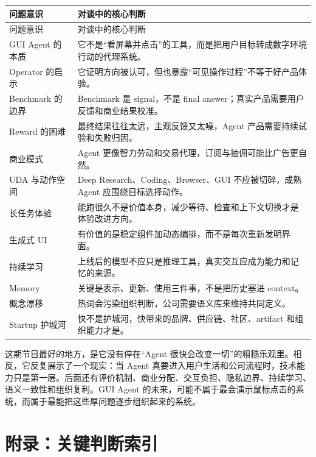 \documentclass[a4paper]{article}
\begin{document}
\begin{longtable}{>{\raggedright\arraybackslash}p{} >{\raggedright\arraybackslash}p{}}
\toprule
问题意识 & 对谈中的核心判断 \\
\midrule
\endfirsthead
\toprule
问题意识 & 对谈中的核心判断 \\
\midrule
\endhead
GUI Agent 的本质 & 它不是“看屏幕并点击”的工具，而是把用户目标转成数字环境行动的代理系统。 \\
Operator 的启示 & 它证明方向被认可，但也暴露“可见操作过程”不等于好产品体验。 \\
Benchmark 的边界 & Benchmark 是 signal，不是 final answer；真实产品需要用户反馈和商业结果校准。 \\
Reward 的困难 & 最终结果往往太远，主观反馈又太噪，Agent 产品需要持续试验和失败归因。 \\
商业模式 & Agent 更像智力劳动和交易代理，订阅与抽佣可能比广告更自然。 \\
UDA 与动作空间 & Deep Research、Coding、Browser、GUI 不应被切碎，成熟 Agent 应围绕目标选择动作。 \\
长任务体验 & 能跑很久不是价值本身，减少等待、检查和上下文切换才是体验改进方向。 \\
生成式 UI & 有价值的是稳定组件加动态编排，而不是每次重新发明界面。 \\
持续学习 & 上线后的模型不应只是推理工具，真实交互应成为能力和记忆的来源。 \\
Memory & 关键是表示、更新、使用三件事，不是把历史塞进 context。 \\
概念漂移 & 热词会污染组织判断，公司需要语义库来维持共同定义。 \\
Startup 护城河 & 快不是护城河，快带来的品牌、供应链、社区、artifact 和组织能力才是。 \\
\bottomrule
\end{longtable}

这期节目最好的地方，是它没有停在“Agent 很快会改变一切”的粗糙乐观里。相反，它反复展示了一个现实：当 Agent 真要进入用户生活和公司流程时，技术能力只是第一层。后面还有评价机制、商业分配、交互负担、隐私边界、持续学习、语义一致性和组织复利。GUI Agent 的未来，可能不属于最会演示鼠标点击的系统，而属于最能把这些厚问题逐步组织起来的系统。

\section*{附录：关键判断索引}
\end{document}
